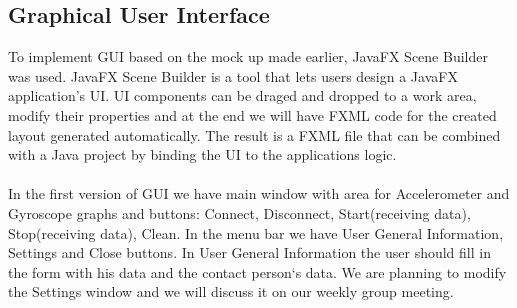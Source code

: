 \documentclass[conference,12pt]{IEEETran}
\begin{document}
\subsection{Graphical User Interface} 
To implement GUI based on the mock up made earlier, JavaFX Scene Builder\cite{JavaFX} was used. JavaFX Scene Builder is a tool that lets users design a JavaFX application's UI. UI components can be draged and dropped to a work area, modify their properties and at the end we will have FXML code for the created layout generated automatically. The result is a FXML file that can be combined with a Java project by binding the UI to the applications logic. \\\\
In the first version of GUI we have main window with area for Accelerometer and Gyroscope graphs and buttons: Connect, Disconnect, Start(receiving data), Stop(receiving data), Clean. In the menu bar we have User General Information, Settings and Close buttons. In User General Information the user should fill in the form with his data and the contact person`s data. We are planning to modify the Settings window and we will discuss it on our weekly group meeting.
\end{document}
